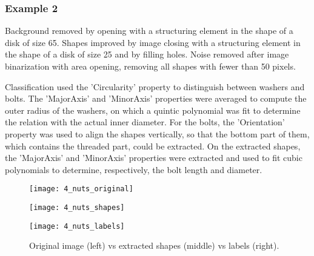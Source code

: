 \newpage

\subsubsection{Example 2}

Background removed by opening with a structuring element in the shape of a disk of size 65. Shapes improved by image closing with a structuring element in the shape of a disk of size 25 and by filling holes. Noise removed after image binarization with area opening, removing all shapes with fewer than 50 pixels.

Classification used the 'Circularity' property to distinguish between washers and bolts. The 'MajorAxis' and 'MinorAxis' properties were averaged to compute the outer radius of the washers, on which a quintic polynomial was fit to determine the relation with the actual inner diameter. For the bolts, the 'Orientation' property was used to align the shapes vertically, so that the bottom part of them, which contains the threaded part, could be extracted. On the extracted shapes, the 'MajorAxis' and 'MinorAxis' properties were extracted and used to fit cubic polynomials to determine, respectively, the bolt length and diameter.

\begin{figure}[h]
\centering
\begin{minipage}{0.3\textwidth}
\texttt{[image: 4\_nuts\_original]}
\end{minipage}
\begin{minipage}{0.3\textwidth}
\texttt{[image: 4\_nuts\_shapes]}
\end{minipage}
\begin{minipage}{0.3\textwidth}
\texttt{[image: 4\_nuts\_labels]}
\end{minipage}
\caption{Original image (left) vs extracted shapes (middle) vs labels (right).}
\end{figure}